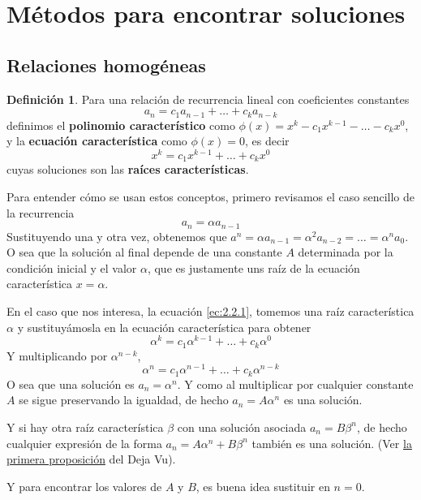 \documentclass[spanish]{book}
\theoremstyle{definition}
\newtheorem*{defn}{Definición}
\begin{document}
\section{Métodos para encontrar soluciones}
\subsection{Relaciones homogéneas}
	\begin{defn}
		Para una relación de recurrencia lineal con coeficientes constantes
		\begin{equation}\label{ec:2.2.1}
			a_n=c_1a_{n-1}+\ldots+c_ka_{n-k}
		\end{equation}
		definimos el \textbf{polinomio característico} como $\phi(x)=x^k-c_1x^{k-1}-\ldots-c_kx^{0}$, y la \textbf{ecuación característica} como $\phi(x)=0$, es decir
		\[x^k=c_1x^{k-1}+\ldots+c_kx^{0}\]
		 cuyas soluciones son las \textbf{raíces características}.
	\end{defn}
	Para entender cómo se usan estos conceptos, primero revisamos el caso sencillo de la recurrencia
	\[a_n=\alpha a_{n-1}\]
	Sustituyendo una y otra vez, obtenemos que $a^n=\alpha a_{n-1}=\alpha^2a_{n-2}=\ldots=\alpha^na_0$. O sea que la solución al final depende de una constante $A$ determinada por la condición inicial y el valor $\alpha$, que es justamente uns raíz de la ecuación característica $x=\alpha$.
	
	En el caso que nos interesa, la ecuación \eqref{ec:2.2.1}, tomemos una raíz característica $\alpha$ y sustituyámosla en la ecuación característica para obtener
	\[\alpha^k=c_1\alpha^{k-1}+\ldots+c_k\alpha^{0}\]
	Y multiplicando por $\alpha^{n-k}$,
	\[\alpha^n=c_1\alpha^{n-1}+\ldots+c_k\alpha^{n-k}\]
	O sea que una solución es $a_n=\alpha^n$. Y como al multiplicar por cualquier constante $A$ se sigue preservando la igualdad, de hecho $a_n=A\alpha^n$ es una solución.
	
	Y si hay otra raíz característica $\beta$ con una solución asociada $a_n=B\beta^n$, de hecho cualquier expresión de la forma $a_n=A\alpha^n+B\beta^n$ también es una solución. (Ver \hyperref[prop:2.2.2.1.1]{la primera proposición} del Deja Vu).
	
	Y para encontrar los valores de $A$ y $B$, es buena idea sustituir en $n=0$.
	
\end{document}
